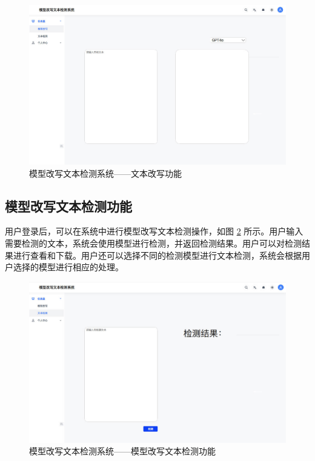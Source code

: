 \begin{figure}[htb]
    \centering
    \includegraphics[width=\textwidth]{figures/sys-polish.jpg}
    \caption{模型改写文本检测系统——文本改写功能}
    \label{fig:sys-polish}
\end{figure}

\subsection{模型改写文本检测功能}

用户登录后，可以在系统中进行模型改写文本检测操作，如图 \ref{fig:sys-detect} 所示。用户输入需要检测的文本，系统会使用模型进行检测，并返回检测结果。用户可以对检测结果进行查看和下载。用户还可以选择不同的检测模型进行文本检测，系统会根据用户选择的模型进行相应的处理。

\begin{figure}[htb]
    \centering
    \includegraphics[width=\textwidth]{figures/sys-detect.jpg}
    \caption{模型改写文本检测系统——模型改写文本检测功能}
    \label{fig:sys-detect}
\end{figure}

